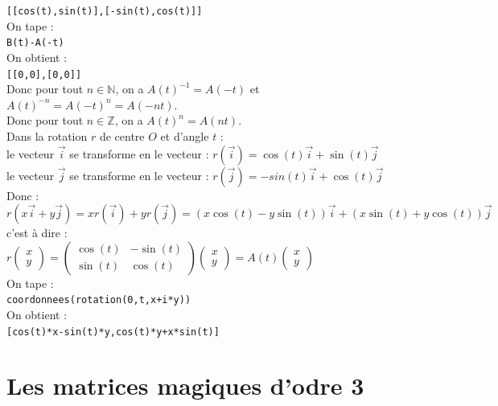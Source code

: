 \documentclass[a4paper,11pt]{book}
\newcommand{\Z}{{\mathbb{Z}}}
\newcommand{\N}{{\mathbb{N}}}
\begin{document}
{\tt [[cos(t),sin(t)],[-sin(t),cos(t)]]}\\
On tape :\\
{\tt B(t)-A(-t)}\\
On obtient :\\
{\tt [[0,0],[0,0]]}\\
Donc pour tout $n\in \N$, on a $A(t)^{-1}=A(-t)$ et  $A(t)^{-n}=A(-t)^n=A(-nt)$.\\
Donc pour tout $n\in \Z$, on a   $A(t)^{n}=A(nt)$.\\
Dans la rotation $r$ de centre $O$ et d'angle $t$ :\\
le vecteur $\overrightarrow i$ se transforme en le vecteur :
$r(\overrightarrow i)=\cos(t)\overrightarrow i+\sin(t)\overrightarrow j$\\
le vecteur $\overrightarrow j$ se transforme en le vecteur :
$r(\overrightarrow j)=-sin(t)\overrightarrow i+\cos(t)\overrightarrow j$\\
Donc :\\
$r(x\overrightarrow i+y\overrightarrow j)=xr(\overrightarrow i)+yr(\overrightarrow j)=(x\cos(t)-y\sin(t))\overrightarrow i+(x\sin(t)+y\cos(t))\overrightarrow j$\\
c'est \`a dire :\\
$r\left(\begin{array}{c}
  x\\
  y
\end{array}\right)=\left(
\begin{array}{cc}
  \cos(t)&-\sin(t)\\
  \sin(t)&\cos(t)
\end{array}
\right)\left(\begin{array}{c}
  x\\
  y
\end{array}\right)=
A(t)\left(\begin{array}{c}
  x\\
  y
\end{array}\right)$\\
On tape :\\
{\tt coordonnees(rotation(0,t,x+i*y))}\\
On obtient :\\
{\tt [cos(t)*x-sin(t)*y,cos(t)*y+x*sin(t)]}
\section{Les matrices magiques d'odre 3}
\end{document}
